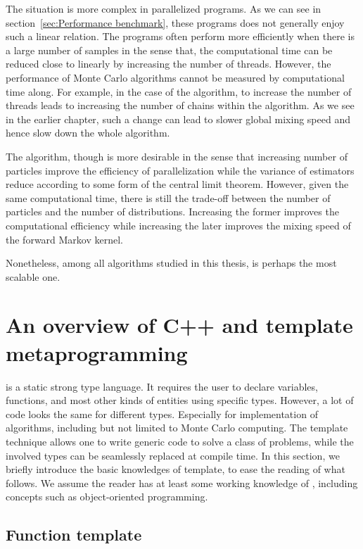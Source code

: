 The situation is more complex in parallelized programs. As we can see in
section~\ref{sec:Performance benchmark}, these programs does not generally
enjoy such a linear relation. The programs often perform more efficiently when
there is a large number of samples in the sense that, the computational time
can be reduced close to linearly by increasing the number of threads. However,
the performance of Monte Carlo algorithms cannot be measured by computational
time along. For example, in the case of the \pmcmc algorithm, to increase the
number of threads leads to increasing the number of \mcmc chains within the
algorithm. As we see in the earlier chapter, such a change can lead to slower
global mixing speed and hence slow down the whole algorithm.

The \smc algorithm, though is more desirable in the sense that increasing
number of particles improve the efficiency of parallelization while the
variance of estimators reduce according to some form of the central limit
theorem. However, given the same computational time, there is still the
trade-off between the number of particles and the number of distributions.
Increasing the former improves the computational efficiency while increasing
the later improves the mixing speed of the forward Markov kernel.

Nonetheless, among all algorithms studied in this thesis, \smc is perhaps the
most scalable one.

\section{An overview of C++ and template metaprogramming}
\label{sec:An overview of C++ and template metaprogramming}

\cpp is a static strong type language. It requires the user to declare
variables, functions, and most other kinds of entities using specific types.
However, a lot of code looks the same for different types. Especially for
implementation of algorithms, including but not limited to Monte Carlo
computing. The \cpp template technique allows one to write generic code to
solve a class of problems, while the involved types can be seamlessly replaced
at compile time. In this section, we briefly introduce the basic knowledges of
\cpp template, to ease the reading of what follows. We assume the reader has
at least some working knowledge of \cpp, including concepts such as
object-oriented programming.

\subsection{Function template}
\label{sub:Function template}

